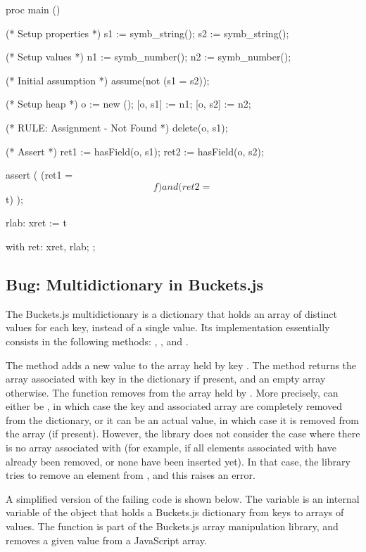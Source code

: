 \begin{lstjshere}
proc main () {
    (* Setup properties *)
    s1 := symb_string();
    s2 := symb_string();

    (* Setup values *)
    n1 := symb_number();
    n2 := symb_number();

    (* Initial assumption *)
    assume(not (s1 = s2));

    (* Setup heap *)
    o := new ();
    [o, s1] := n1;
    [o, s2] := n2;

    (* RULE: Assignment - Not Found *)
    delete(o, s1);

    (* Assert *)
    ret1 := hasField(o, s1);
    ret2 := hasField(o, s2);

    assert (
        (ret1 = $$f) and (ret2 = $$t)
    );

    rlab:   xret := $$t
}
with
{
    ret:    xret, rlab;
};
\end{lstjshere}
 
\subsection{Bug: Multidictionary in Buckets.js}

The Buckets.js multidictionary is a dictionary that holds an array of distinct values for each key, instead of a single value.
Its implementation essentially consists in the following methods: , , and .

The  method adds a new value  to the array held by key .
The  method returns the array associated with key  in the dictionary if present, and an empty array otherwise.
The  function removes  from the array held by .
More precisely,  can either be , in which case the key and associated array are completely removed from the dictionary, or it can be an actual value, in which case it is removed from the array (if present).
However, the library does not consider the case where there is no array associated with  (for example, if all elements associated with  have already been removed, or none have been inserted yet).
In that case, the library tries to remove an element from , and this raises an error.

A simplified version of the failing code is shown below.
The  variable is an internal variable of the  object that holds a Buckets.js dictionary from keys to arrays of values.
The  function is part of the Buckets.js array manipulation library, and removes a given value from a JavaScript array.

